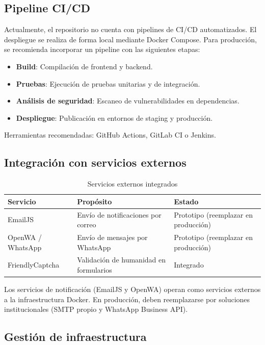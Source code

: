 \documentclass[12pt,letterpaper]{article}
\begin{document}
\subsection{Pipeline CI/CD}

Actualmente, el repositorio no cuenta con pipelines de CI/CD automatizados. El despliegue se realiza de forma local mediante Docker Compose. Para producción, se recomienda incorporar un pipeline con las siguientes etapas:

\begin{itemize}
    \item \textbf{Build}: Compilación de frontend y backend.
    \item \textbf{Pruebas}: Ejecución de pruebas unitarias y de integración.
    \item \textbf{Análisis de seguridad}: Escaneo de vulnerabilidades en dependencias.
    \item \textbf{Despliegue}: Publicación en entornos de staging y producción.
\end{itemize}

Herramientas recomendadas: GitHub Actions, GitLab CI o Jenkins.

\subsection{Integración con servicios externos}

\begin{table}[H]
\centering
\caption{Servicios externos integrados}
\label{tab:servicios-externos}
\begin{tabular}{|l|l|p{5cm}|}
\hline
\textbf{Servicio} & \textbf{Propósito} & \textbf{Estado} \\ \hline
EmailJS & Envío de notificaciones por correo & Prototipo (reemplazar en producción) \\ \hline
OpenWA / WhatsApp & Envío de mensajes por WhatsApp & Prototipo (reemplazar en producción) \\ \hline
FriendlyCaptcha & Validación de humanidad en formularios & Integrado \\ \hline
\end{tabular}
\end{table}

Los servicios de notificación (EmailJS y OpenWA) operan como servicios externos a la infraestructura Docker. En producción, deben reemplazarse por soluciones institucionales (SMTP propio y WhatsApp Business API).

\subsection{Gestión de infraestructura}
\end{document}
